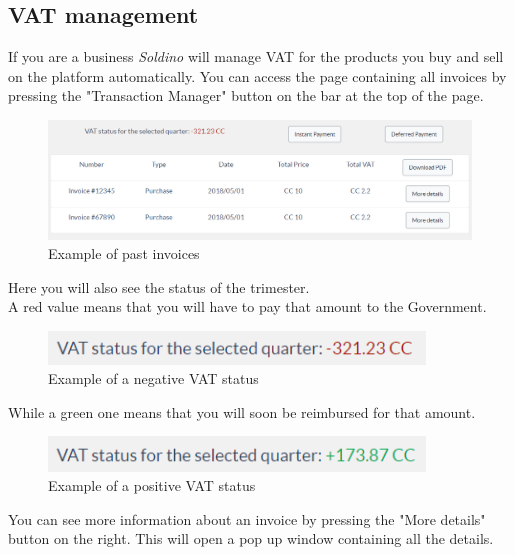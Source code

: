 	\subsection{VAT management}
	If you are a business \textit{Soldino} will manage VAT for the products 
	you buy and sell on the platform automatically. You can access the page 
	containing all invoices by pressing the "Transaction Manager" button 
	on the bar at the top of the page.
	\begin{figure}[H]
		\includegraphics[width=15cm]{res/images/past_invoices.png}
		\centering
		\caption{Example of past invoices}
	\end{figure}
	\noindent Here you will also see the status of the trimester. 
	\\A red value means that you will have to pay that amount to the 
	Government.
	\begin{figure}[H]
		\includegraphics[width=10cm]{res/images/negative_vat_status.png}
		\centering
		\caption{Example of a negative VAT status}
	\end{figure}
	\noindent While a green one means that you will soon be reimbursed for 
	that amount.
	\begin{figure}[H]
		\includegraphics[width=10cm]{res/images/positive_vat_status.png}
		\centering
		\caption{Example of a positive VAT status}
	\end{figure}
	\noindent You can see more information about an invoice by pressing the 
	"More details" button on the right. This will open a pop up window 
	containing all the details.
